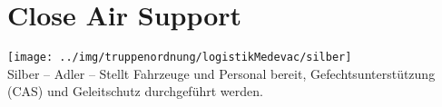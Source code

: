 \section{Close Air Support}
\texttt{[image: ../img/truppenordnung/logistikMedevac/silber]}\\
Silber -- Adler -- Stellt Fahrzeuge und Personal bereit,  Gefechtsunterstützung (\ac{CAS}) und Geleitschutz durchgeführt werden.